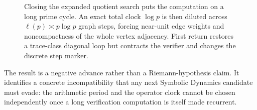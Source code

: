 \begin{figure}[t]
\centering
\resizebox{\textwidth}{!}{}
\caption{Closing the expanded quotient search puts the computation on a long
prime cycle.  An exact total clock $\log p$ is then diluted across
$\ell(p)\asymp p\log p$ graph steps, forcing near-unit edge weights and
noncompactness of the whole vertex adjacency.  First return restores a
trace-class diagonal loop but contracts the verifier and changes the discrete
step marker.}
\label{fig:overview}
\end{figure}

The result is a negative advance rather than a Riemann-hypothesis claim.  It
identifies a concrete incompatibility that any next Symbolic Dynamics
candidate must evade: the arithmetic period and the operator clock cannot be
chosen independently once a long verification computation is itself made
recurrent.
